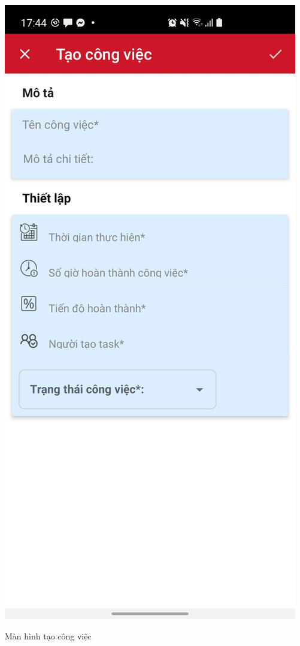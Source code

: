 \documentclass[../Main.tex]{subfiles}
\begin{document}
\begin{minipage}{0.5\textwidth}
\includegraphics[width=0.70\linewidth]{Figure/screen/new_task.jpg}
 \label{fig:star2}
\end{minipage}
\caption{Màn hình tạo công việc} \label{fig:screen_login}
\end{document}
